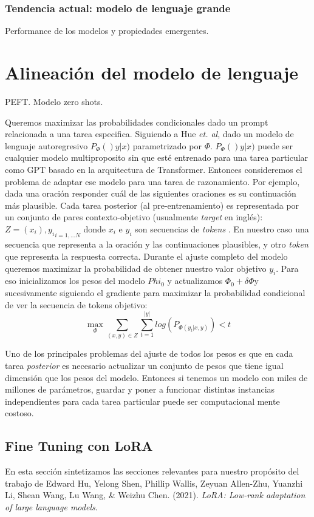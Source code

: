 \documentclass{book}
\begin{document}
\subsection{Tendencia actual: modelo de lenguaje grande}
Performance de los modelos y propiedades emergentes. 


\chapter{Alineación del modelo de lenguaje} 
PEFT. Modelo zero shots. 

Queremos maximizar las probabilidades condicionales dado un prompt relacionada a una tarea especifica. Siguiendo a Hue \textit{et. al}, dado un modelo de lenguaje autoregresivo $P_{\Phi}()y|x)$ parametrizado por $\Phi$. $P_{\Phi}()y|x)$ puede ser cualquier modelo multiproposito sin que esté entrenado para una tarea particular como GPT basado en la arquitectura de Transformer. Entonces consideremos el problema de adaptar ese modelo para una tarea de razonamiento. Por ejemplo, dada una oración responder cuál de las siguientes oraciones es su continuación más plausible. Cada tarea posterior (al pre-entrenamiento) es representada por un conjunto de pares contexto-objetivo (usualmente \textit{target} en inglés): $Z={(x_i),y_i}_{i=1,...N}$ donde $x_i$ e $y_i$ son secuencias de \textit{tokens} \cite{hu2021lora}. En nuestro caso una secuencia que representa a la oración y las continuaciones plausibles, y otro \textit{token} que representa la respuesta correcta.
Durante el ajuste completo del modelo queremos maximizar la probabilidad de obtener nuestro valor objetivo $y_i$. Para eso inicializamos los pesos del modelo $Phi_{0}$ y actualizamos $\Phi_0 + \delta\Phi$y sucesivamente siguiendo el gradiente para maximizar la probabilidad condicional de ver la secuencia de tokens objetivo:
$$\max_{\Phi} \sum_{(x,y)\in Z} \sum_{t=1}^{|y|} log (P_{\Phi(y_t|x,y)})<t$$

Uno de los principales problemas del ajuste de todos los pesos es que en cada tarea \textit{posterior} es necesario actualizar un conjunto de pesos que tiene igual dimensión que los pesos del modelo. Entonces si tenemos un modelo con miles de millones de parámetros, guardar y poner a funcionar distintas instancias independientes para cada tarea particular puede ser computacional mente costoso. \cite{hu2021lora}

\section{Fine Tuning con LoRA} 
En esta sección sintetizamos las secciones relevantes para nuestro propósito del trabajo de Edward Hu, Yelong Shen, Phillip Wallis, Zeyuan Allen-Zhu, Yuanzhi Li, Shean Wang, Lu Wang, \& Weizhu Chen. (2021). \textit{LoRA: Low-rank adaptation of large language models}.\\
\end{document}
